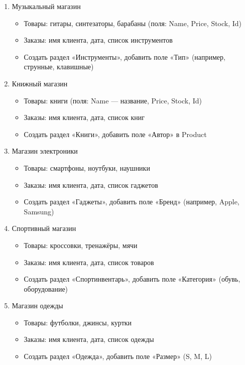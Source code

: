 \documentclass[12pt]{article}
\begin{document}
\begin{enumerate}
	\item Музыкальный магазин
	      \begin{itemize}
		      \item Товары: гитары, синтезаторы, барабаны (поля: Name, Price, Stock, Id)
		      \item Заказы: имя клиента, дата, список инструментов
		      \item Создать раздел «Инструменты», добавить поле «Тип» (например, струнные, клавишные)
	      \end{itemize}

	\item Книжный магазин
	      \begin{itemize}
		      \item Товары: книги (поля: Name — название, Price, Stock, Id)
		      \item Заказы: имя клиента, дата, список книг
		      \item Создать раздел «Книги», добавить поле «Автор» в Product
	      \end{itemize}

	\item Магазин электроники
	      \begin{itemize}
		      \item Товары: смартфоны, ноутбуки, наушники
		      \item Заказы: имя клиента, дата, список гаджетов
		      \item Создать раздел «Гаджеты», добавить поле «Бренд» (например, Apple, Samsung)
	      \end{itemize}


	\item Спортивный магазин
	      \begin{itemize}
		      \item Товары: кроссовки, тренажёры, мячи
		      \item Заказы: имя клиента, дата, список товаров
		      \item Создать раздел «Спортинвентарь», добавить поле «Категория» (обувь, оборудование)
	      \end{itemize}

	\item Магазин одежды
	      \begin{itemize}
		      \item Товары: футболки, джинсы, куртки
		      \item Заказы: имя клиента, дата, список одежды
		      \item Создать раздел «Одежда», добавить поле «Размер» (S, M, L)
	      \end{itemize}


\end{enumerate}
\end{document}
